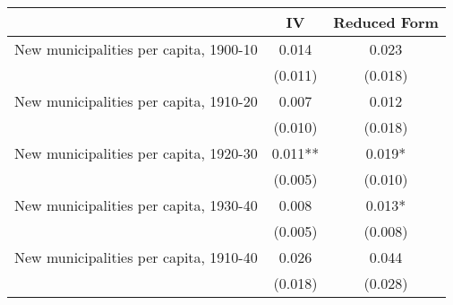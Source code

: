  \begin{tabular}{l*{2}{c}} \toprule
                &\multicolumn{1}{c}{IV}&\multicolumn{1}{c}{Reduced Form}\\
\midrule
New municipalities per capita, 1900-10&    0.014   &    0.023   \\
                &  (0.011)   &  (0.018)   \\
\addlinespace
New municipalities per capita, 1910-20&    0.007   &    0.012   \\
                &  (0.010)   &  (0.018)   \\
\addlinespace
New municipalities per capita, 1920-30&    0.011** &    0.019*  \\
                &  (0.005)   &  (0.010)   \\
\addlinespace
New municipalities per capita, 1930-40&    0.008   &    0.013*  \\
                &  (0.005)   &  (0.008)   \\
\addlinespace
New municipalities per capita, 1910-40&    0.026   &    0.044   \\
                &  (0.018)   &  (0.028)   \\
 \bottomrule \end{tabular}
